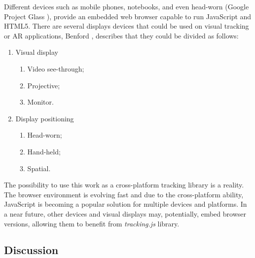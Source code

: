 Different devices such as mobile phones, notebooks, and even head-worn \cite{Benford1998} (Google Project Glass \cite{Glass2013}), provide an embedded web browser capable to run JavaScript and HTML5. There are several displays devices that could be used on visual tracking or AR applications, Benford \cite{Benford1998}, describes that they could be divided as follows:

\begin{enumerate}
  \item Visual display
    \begin{enumerate}
      \item Video see-through;
      \item Projective;
      \item Monitor.
    \end{enumerate}

  \item Display positioning
    \begin{enumerate}
      \item Head-worn;
      \item Hand-held;
      \item Spatial.
    \end{enumerate}
\end{enumerate}

The possibility to use this work as a cross-platform tracking library is a reality. The browser environment is evolving fast and due to the cross-platform ability, JavaScript is becoming a popular solution for multiple devices and platforms. In a near future, other devices and visual displays may, potentially, embed browser versions, allowing them to benefit from \textit{tracking.js} library.


\subsection{Discussion} %
\label{sub:basic_concepts:visual_tracking:discussion}

